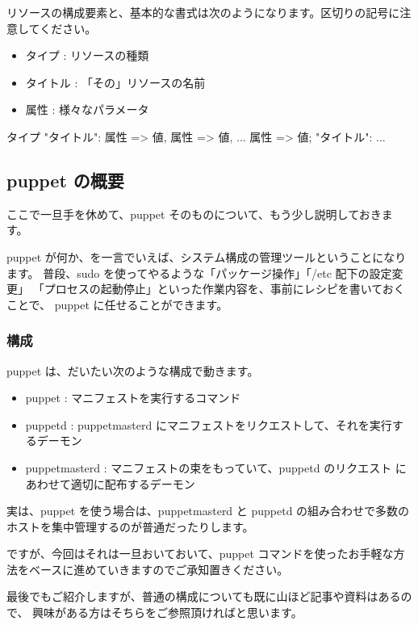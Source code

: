 \documentclass[mingoth,a4paper]{jsarticle}
\begin{document}
リソースの構成要素と、基本的な書式は次のようになります。区切りの記号に注意してください。

\begin{itemize}
 \item タイプ : リソースの種類
 \item タイトル : 「その」リソースの名前
 \item 属性 : 様々なパラメータ
\end{itemize}

\begin{commandline}
タイプ {
  "タイトル":
    属性 => 値,
    属性 => 値,
    ...
    属性 => 値;
  "タイトル":
    ...
}
\end{commandline}

\subsection{puppet の概要}

ここで一旦手を休めて、puppet そのものについて、もう少し説明しておきます。

puppet が何か、を一言でいえば、システム構成の管理ツールということになります。
普段、sudo を使ってやるような「パッケージ操作」「/etc 配下の設定変更」
「プロセスの起動停止」といった作業内容を、事前にレシピを書いておくことで、
puppet に任せることができます。

\subsubsection{構成}

puppet は、だいたい次のような構成で動きます。

\begin{itemize}
\item puppet : マニフェストを実行するコマンド
\item puppetd : puppetmasterd にマニフェストをリクエストして、それを実行するデーモン
\item puppetmasterd : マニフェストの束をもっていて、puppetd のリクエスト
      にあわせて適切に配布するデーモン
\end{itemize}

実は、puppet を使う場合は、puppetmasterd と puppetd の組み合わせで多数の
ホストを集中管理するのが普通だったりします。

ですが、今回はそれは一旦おいておいて、puppet コマンドを使ったお手軽な方
法をベースに進めていきますのでご承知置きください。

最後でもご紹介しますが、普通の構成についても既に山ほど記事や資料はあるので、
興味がある方はそちらをご参照頂ければと思います。
\end{document}
